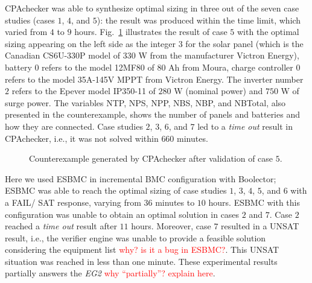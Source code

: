 \documentclass[runningheads]{llncs}
\begin{document}
CPAchecker was able to synthesize optimal sizing in three out of the seven case studies (cases $1$, $4$, and $5$): the result was produced within the time limit, which varied from $4$ to $9$ hours. 
Fig.~\ref{fig:CPAoptc1} illustrates the result of case $5$ with the optimal sizing appearing on the left side as the integer $3$ for the solar panel (which is the Canadian CS6U-330P model of $330$ W from the manufacturer Victron Energy), battery $0$ refers to the model 12MF80 of $80$ Ah from Moura, charge controller $0$ refers to the model 35A-145V MPPT from Victron Energy. The inverter number $2$ refers to the Epever model IP350-11 of $280$ W (nominal power) and $750$ W of surge power. The variables NTP, NPS, NPP, NBS, NBP, and NBTotal, also presented in the counterexample, shows the number of panels and batteries and how they are connected.
Case studies $2$, $3$, $6$, and $7$ led to a \textit{time out} result in CPAchecker, i.e., it was not solved within $660$ minutes.  
%
\begin{figure}[h]
\centering
\caption{Counterexample generated by CPAchecker after validation of case $5$.}
\label{fig:CPAoptc1}
\end{figure}


Here we used ESBMC in incremental BMC configuration with Boolector; ESBMC was able to reach the optimal sizing of case studies $1$, $3$, $4$, $5$, and $6$ with a FAIL/ SAT response, varying from $36$ minutes to $10$ hours. 
ESBMC with this configuration was unable to obtain an optimal solution in cases $2$ and $7$. Case $2$ reached a \textit{time out} result after $11$ hours. Moreover, case $7$ resulted in a UNSAT result, i.e., the verifier engine was unable to provide a feasible solution considering the equipment list \textcolor{red}{why? is it a bug in ESBMC?}. This UNSAT situation was reached in less than one minute.
%
%
These experimental results partially answers the \textit{EG2} \textcolor{red}{why ``partially''? explain here}.
\end{document}
